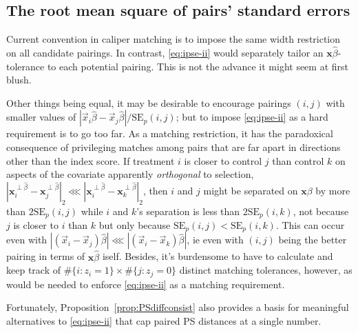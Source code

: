 \documentclass{article}
\theoremstyle{remark}
\begin{document}
\subsection{The root mean square of pairs' standard errors}

Current convention in caliper matching is to impose the same width restriction on all candidate pairings.  In contrast, \eqref{eq:ipse-ii} would separately tailor an $\mathbf{x}\hat\beta $-tolerance to each potential pairing.  This is not the advance it might seem at first blush.  

Other things being equal, it may be desirable to encourage pairings $(i,j)$ with smaller values of $|\vec{x}_{i}\hat\beta - \vec{x}_{j}\hat\beta|/\mathrm{SE}_{p}(i,j)$; but to impose \eqref{eq:ipse-ii} as a hard requirement is to go too far.  As a matching restriction, it has the paradoxical consequence of privileging matches among pairs that are far apart in directions other than the index score.  If treatment $i$ is closer to control $j$ than control $k$ on aspects of the covariate apparently \textit{orthogonal} to selection, $|\mathbf{x}^{\perp\hat\beta}_{i} - \mathbf{x}^{\perp\hat\beta}_{j} |_{2} \lll |\mathbf{x}^{\perp\hat\beta}_{i} - \mathbf{x}^{\perp\hat\beta}_{k} |_{2}$, then $i$ and $j$ might be separated on $\mathbf{x}\beta $ by more than $2\mathrm{SE}_{p}(i,j)$ while $i$ and $k$'s separation is less than $2\mathrm{SE}_{p}(i,k)$, not because $j$ is closer to $i$ than $k$ but only because $\mathrm{SE}_{p}(i,j) < \mathrm{SE}_{p}(i,k) $.  This can occur even with $|(\vec{x}_{i} - \vec{x}_{j})\hat\beta| \lll |(\vec{x}_{i} - \vec{x}_{k})\hat\beta|$, ie even with $(i,j)$ being the better pairing in terms of $\mathbf{x}\hat\beta$ iself.  Besides, it's burdensome to have to calculate and keep track of $\# \{ i: z_i=1\} \times \# \{ j: z_j=0\}$ distinct matching tolerances, however, as would be needed to enforce \eqref{eq:ipse-ii} as a matching requirement. 

Fortunately,  Proposition~\ref{prop:PSdiffconsist} also provides a basis for
meaningful alternatives to \eqref{eq:ipse-ii} that cap paired PS distances at a single number.%
\end{document}
